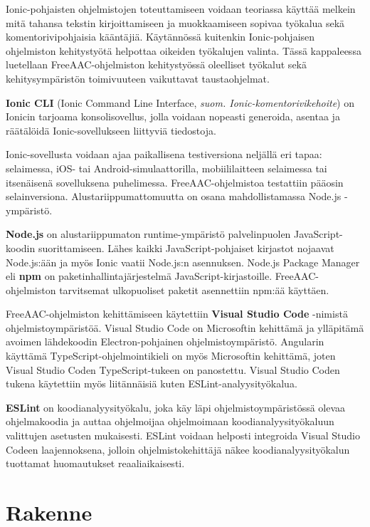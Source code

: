 \documentclass[utf8]{gradu3}
\begin{document}
Ionic-pohjaisten ohjelmistojen toteuttamiseen voidaan teoriassa käyttää melkein mitä tahansa tekstin kirjoittamiseen ja muokkaamiseen sopivaa työkalua sekä komentorivipohjaisia kääntäjiä. Käytännössä kuitenkin Ionic-pohjaisen ohjelmiston kehitystyötä helpottaa oikeiden työkalujen valinta. Tässä kappaleessa luetellaan FreeAAC-ohjelmiston kehitystyössä oleelliset työkalut sekä kehitysympäristön toimivuuteen vaikuttavat taustaohjelmat.

\textbf{Ionic CLI} (Ionic Command Line Interface, \textit{suom. Ionic-komentorivikehoite}) on Ionicin tarjoama konsolisovellus, jolla voidaan nopeasti generoida, asentaa ja räätälöidä Ionic-sovellukseen liittyviä tiedostoja.

Ionic-sovellusta voidaan ajaa paikallisena testiversiona neljällä eri tapaa: selaimessa, iOS- tai Android-simulaattorilla, mobiililaitteen selaimessa tai itsenäisenä sovelluksena puhelimessa. FreeAAC-ohjelmistoa testattiin pääosin selainversiona. Alustariippumattomuutta on osana mahdollistamassa Node.js -ympäristö.

\textbf{Node.js} on alustariippumaton runtime-ympäristö palvelinpuolen JavaScript-koodin suorittamiseen. Lähes kaikki JavaScript-pohjaiset kirjastot nojaavat Node.js:ään ja myös Ionic vaatii Node.js:n asennuksen. Node.js Package Manager eli \textbf{npm} on paketinhallintajärjestelmä JavaScript-kirjastoille. FreeAAC-ohjelmiston tarvitsemat ulkopuoliset paketit asennettiin npm:ää käyttäen.

FreeAAC-ohjelmiston kehittämiseen käytettiin \textbf{Visual Studio Code} -nimistä ohjelmistoympäristöä. Visual Studio Code on Microsoftin kehittämä ja ylläpitämä avoimen lähdekoodin Electron-pohjainen ohjelmistoympäristö. Angularin käyttämä TypeScript-ohjelmointikieli on myös Microsoftin kehittämä, joten Visual Studio Coden TypeScript-tukeen on panostettu. Visual Studio Coden tukena käytettiin myös liitännäisiä kuten ESLint-analyysityökalua.

\textbf{ESLint} on koodianalyysityökalu, joka käy läpi ohjelmistoympäristössä olevaa ohjelmakoodia ja auttaa ohjelmoijaa ohjelmoimaan koodianalyysityökaluun valittujen asetusten mukaisesti. ESLint voidaan helposti integroida Visual Studio Codeen laajennoksena, jolloin ohjelmistokehittäjä näkee koodianalyysityökalun tuottamat huomautukset reaaliaikaisesti.

\section{Rakenne}
\end{document}
